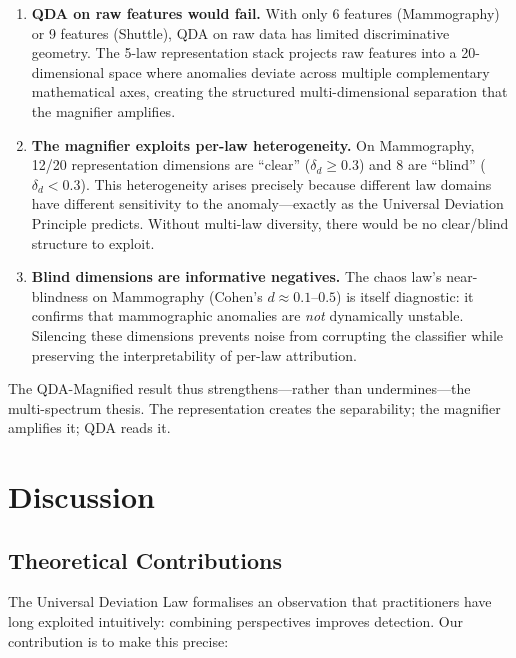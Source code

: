 \documentclass[journal]{IEEEtran}
\begin{document}
\begin{enumerate}
  \item \textbf{QDA on raw features would fail.} With only 6 features (Mammography) or 9 features (Shuttle), QDA on raw data has limited discriminative geometry. The 5-law representation stack projects raw features into a 20-dimensional space where anomalies deviate across multiple complementary mathematical axes, creating the structured multi-dimensional separation that the magnifier amplifies.
  \item \textbf{The magnifier exploits per-law heterogeneity.} On Mammography, 12/20 representation dimensions are ``clear'' ($\delta_d \geq 0.3$) and 8 are ``blind'' ($\delta_d < 0.3$). This heterogeneity arises precisely because different law domains have different sensitivity to the anomaly---exactly as the Universal Deviation Principle predicts. Without multi-law diversity, there would be no clear/blind structure to exploit.
  \item \textbf{Blind dimensions are informative negatives.} The chaos law's near-blindness on Mammography (Cohen's $d \approx 0.1$--$0.5$) is itself diagnostic: it confirms that mammographic anomalies are \textit{not} dynamically unstable. Silencing these dimensions prevents noise from corrupting the classifier while preserving the interpretability of per-law attribution.
\end{enumerate}

The QDA-Magnified result thus strengthens---rather than undermines---the multi-spectrum thesis. The representation creates the separability; the magnifier amplifies it; QDA reads it.

\section{Discussion}
\label{sec:discussion}

\subsection{Theoretical Contributions}

The Universal Deviation Law formalises an observation that practitioners have long exploited intuitively: combining perspectives improves detection. Our contribution is to make this precise:
\end{document}
